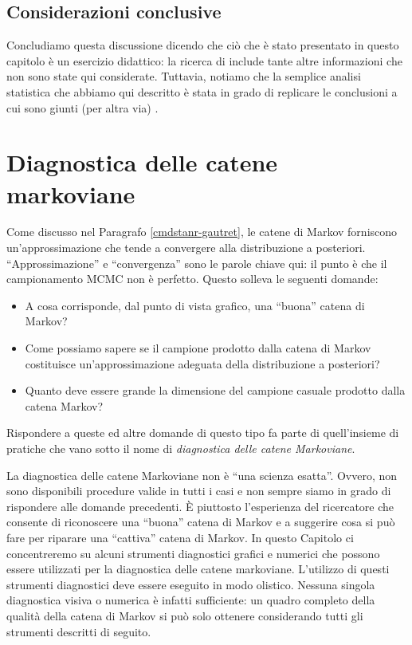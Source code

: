\documentclass[
  11pt,
  italian,
  a4paper,
  extrafontsizes,onecolumn,openright
  ]{memoir}
\providecommand{\tightlist}{%
  \setlength{\itemsep}{0pt}\setlength{\parskip}{0pt}}
\newlength{\rf}
\begin{document}
\hypertarget{considerazioni-conclusive}{%
\section*{Considerazioni conclusive}\label{considerazioni-conclusive}}

Concludiamo questa discussione dicendo che ciò che è stato presentato in questo capitolo è un esercizio didattico: la ricerca di \textcite{Gautret_2020} include tante altre informazioni che non sono state qui considerate. Tuttavia, notiamo che la semplice analisi statistica che abbiamo qui descritto è stata in grado di replicare le conclusioni a cui sono giunti (per altra via) \textcite{Hulme_2020}.

\hypertarget{diagn-markov-chains}{%
\chapter{Diagnostica delle catene markoviane}\label{diagn-markov-chains}}

Come discusso nel Paragrafo \ref{cmdstanr-gautret}, le catene di Markov forniscono un'approssimazione che tende a convergere alla distribuzione a posteriori. ``Approssimazione'' e ``convergenza'' sono le parole chiave qui: il punto è che il campionamento MCMC non è perfetto. Questo solleva le seguenti domande:

\begin{itemize}
\tightlist
\item
  A cosa corrisponde, dal punto di vista grafico, una ``buona'' catena di Markov?
\item
  Come possiamo sapere se il campione prodotto dalla catena di Markov costituisce un'approssimazione adeguata della distribuzione a posteriori?
\item
  Quanto deve essere grande la dimensione del campione casuale prodotto dalla catena Markov?
\end{itemize}

Rispondere a queste ed altre domande di questo tipo fa parte di quell'insieme di pratiche che vano sotto il nome di \emph{diagnostica delle catene Markoviane}.

La diagnostica delle catene Markoviane non è ``una scienza esatta''. Ovvero, non sono disponibili procedure valide in tutti i casi e non sempre siamo in grado di rispondere alle domande precedenti. È piuttosto l'esperienza del ricercatore che consente di riconoscere una ``buona'' catena di Markov e a suggerire cosa si può fare per riparare una ``cattiva'' catena di Markov. In questo Capitolo ci concentreremo su alcuni strumenti diagnostici grafici e numerici che possono essere utilizzati per la diagnostica delle catene markoviane. L'utilizzo di questi strumenti diagnostici deve essere eseguito in modo olistico. Nessuna singola diagnostica visiva o numerica è infatti sufficiente: un quadro completo della qualità della catena di Markov si può solo ottenere considerando tutti gli strumenti descritti di seguito.
\end{document}
